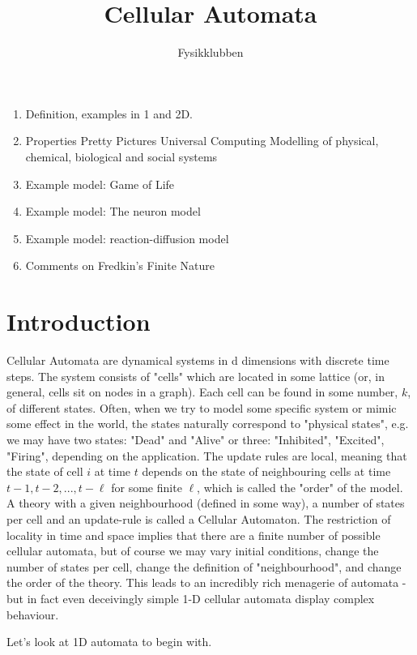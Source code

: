 \documentclass[12pt]{article}
\numberwithin{equation}{section}
\begin{document}
\title{Cellular Automata}
\author{Fysikklubben}
\maketitle
\begin{enumerate}
\item Definition, examples in 1 and 2D.
\item Properties
\subitem Pretty Pictures
\subitem Universal Computing
\subitem Modelling of physical, chemical, biological and social systems
\item Example model: Game of Life
\item Example model: The neuron model
\item Example model: reaction-diffusion model
\item Comments on Fredkin's Finite Nature
\end{enumerate}




\section{Introduction}
Cellular Automata are dynamical systems in d dimensions with discrete time steps. The system consists of "cells" which are located in some lattice (or, in general, cells sit on nodes in a graph). Each cell can be found in some number, \(k\), of different states. Often, when we try to model some specific system or mimic some effect in the world, the states naturally correspond to "physical states", e.g. we may have two states: "Dead" and "Alive" or three: "Inhibited", "Excited", "Firing", depending on the application. The update rules are local, meaning that the state of cell \(i\) at time \(t\) depends on the state of neighbouring cells at time \(t-1, t-2, ..., t-\ell\) for some finite \(\ell\), which is called the "order" of the model. A theory with a given neighbourhood (defined in some way), a number of states per cell and an update-rule is called a Cellular Automaton. The restriction of locality in time and space implies that there are a finite number of possible cellular automata, but of course we may vary initial conditions, change the number of states per cell, change the definition of "neighbourhood", and change the order of the theory. This leads to an incredibly rich menagerie of automata - but in fact even deceivingly simple 1-D cellular automata display complex behaviour. 

Let's look at 1D automata to begin with.
\end{document}
